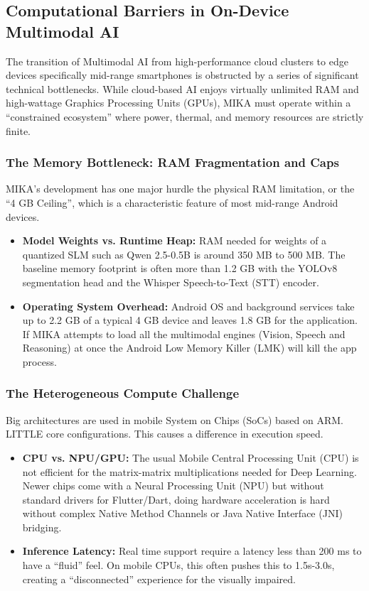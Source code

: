 \documentclass[12pt,a4paper]{report}
\begin{document}
\subsection{Computational Barriers in On-Device Multimodal AI} 
The transition of Multimodal AI from high-performance cloud clusters to edge devices specifically mid-range smartphones is obstructed by a series of significant technical bottlenecks. While cloud-based AI enjoys virtually unlimited RAM and high-wattage Graphics Processing Units (GPUs), MIKA must operate within a ``constrained ecosystem'' where power, thermal, and memory resources are strictly finite. 

\subsubsection{The Memory Bottleneck: RAM Fragmentation and Caps}
MIKA’s development has one major hurdle the physical RAM limitation, or the “4 GB Ceiling”, which is a characteristic feature of most mid-range Android devices. 

\begin{itemize}
    \item \textbf{Model Weights vs. Runtime Heap:} RAM needed for weights of a quantized SLM such as Qwen 2.5-0.5B is around 350 MB to 500 MB. The baseline memory footprint is often more than 1.2 GB with the YOLOv8 segmentation head and the Whisper Speech-to-Text (STT) encoder.
    \item \textbf{Operating System Overhead:} Android OS and background services take up to 2.2 GB of a typical 4 GB device and leaves 1.8 GB for the application. If MIKA attempts to load all the multimodal engines (Vision, Speech and Reasoning) at once the Android Low Memory Killer (LMK) will kill the app process.
\end{itemize}
 
\subsubsection{The Heterogeneous Compute Challenge}
Big architectures are used in mobile System on Chips (SoCs) based on ARM. LITTLE core configura­tions. This causes a difference in execution speed.

\begin{itemize}
    \item \textbf{CPU vs. NPU/GPU:} The usual Mobile Central Processing Unit (CPU) is not efficient for the matrix-matrix multiplications needed for Deep Learning. Newer chips come with a Neural Processing Unit (NPU) but without standard drivers for Flutter/Dart, doing hardware acceleration is hard without complex Native Method Channels or Java Native Interface (JNI) bridging.
    \item \textbf{Inference Latency:} Real time support require a latency less than 200 ms to have a “fluid” feel. On mobile CPUs, this often pushes this to 1.5s-3.0s, creating a “disconnected” experience for the visually impaired.
\end{itemize}
 
\end{document}
